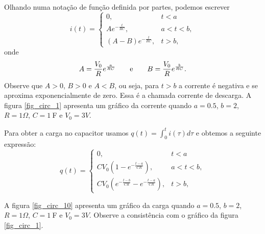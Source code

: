 Olhando numa notação de função definida por partes, podemos escrever
\begin{equation}
i(t)=\left\{\begin{array}{ll}0,&t<a  \\A e^{-\frac{t}{RC}}, &a<t<b, \\ \left(A-B\right)e^{-\frac{t}{RC}}, &t>b, \end{array}\right.
\end{equation}
onde
\begin{equation}
A=\frac{V_0}{R}e^{\frac{a}{RC}}\qquad\hbox{e}\qquad B=\frac{V_0}{R}e^{\frac{b}{RC}}.
\end{equation}
Observe que $A>0$, $B>0$ e $A<B$, ou seja, para $t>b$ a corrente é negativa e se aproxima exponencialmente de zero. Essa é a chamada corrente de descarga. A figura \ref{fig_circ_1} apresenta um gráfico da corrente quando $a=0.5$, $b=2$, $R=1\Omega$, $C=1\ \!$F e $V_0=3V$.

Para obter a carga no capacitor usamos $q(t)=\int_0^t i(\tau)d\tau$ e obtemos a seguinte expressão:
\begin{equation}\label{eq:sol_carga}
q(t)=\left\{\begin{array}{ll}0,&t<a  \\ CV_0\left(1-e^{-\frac{t-a}{CR}}\right), &a<t<b, \\ CV_0\left(e^{-\frac{t-b}{CR}}-e^{-\frac{t-a}{CR}} \right), &t>b, \end{array}\right.
\end{equation}

A figura \ref{fig_circ_10} apresenta um gráfico da carga quando $a=0.5$, $b=2$, $R=1\Omega$, $C=1\ \!$F e $V_0=3V$. Observe a consistência com o gráfico da figura \ref{fig_circ_1}.


